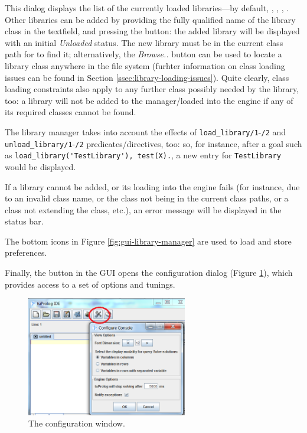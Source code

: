 This dialog displays the list of the currently loaded libraries---by default,
, , , .
%
Other libraries can be added by providing the fully qualified name of the library class in the textfield, and pressing the  button: the added library will be displayed with an initial \textit{Unloaded} status.
The new library must be in the current class path for \tuprolog{} to find it; alternatively, the \textit{Browse..} button can be used to locate a library class anywhere in the file system (furhter information on class loading issues can be found in Section \ref{ssec:library-loading-issues}).
%
Quite clearly, class loading constraints also apply to any further class possibly needed by the library, too: a library will not be added to the manager/loaded into the engine if any of its required classes cannot be found.

The library manager takes into account the effects of \verb|load_library/1|-\verb|/2| and \verb|unload_library/1|-\verb|/2| predicates/directives, too: so, for instance, after a goal such as \verb|load_library('TestLibrary'), test(X).|, a new entry for \verb|TestLibrary| would be displayed.

If a library cannot be added, or its loading into the engine fails (for instance, due to an invalid class name, or the class not being in the current class paths, or a class not extending the  class, etc.), an error message will be displayed in the status bar.

The bottom icons in Figure \ref{fig:gui-library-manager} are used to load and store preferences.

\noindent Finally, the  button in the \tuprolog{} GUI opens the configuration dialog (Figure \ref{fig:gui-configuration}), which provides access to a set of options and tunings.

\begin{figure}
\centering
\includegraphics[width=7cm]{images/gui-config}
\caption{The configuration window.}
\label{fig:gui-configuration}
\end{figure}

